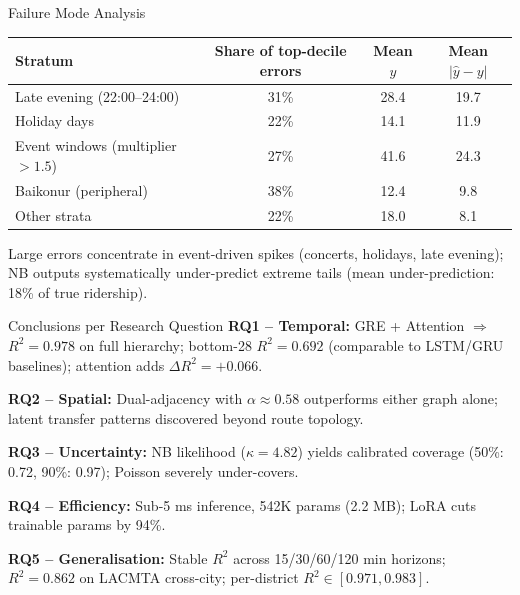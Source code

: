 \documentclass[aspectratio=169, 11pt]{beamer}
\newenvironment{tableslide}[1]{%
  \begin{frame}{#1}%
  \vspace{-0.3em}%
}{%
  \end{frame}%
}
\begin{document}
\begin{tableslide}{Failure Mode Analysis}
\vfill
\begin{center}
\footnotesize
\begin{tabular}{lccc}
  \toprule
  \textbf{Stratum} & \textbf{Share of top-decile errors} & \textbf{Mean $y$} & \textbf{Mean $|\hat y - y|$} \\
  \midrule
  Late evening (22:00--24:00) & 31\% & 28.4 & 19.7 \\
  Holiday days & 22\% & 14.1 & 11.9 \\
  Event windows (multiplier $>1.5$) & 27\% & 41.6 & 24.3 \\
  Baikonur (peripheral) & 38\% & 12.4 & 9.8 \\
  Other strata & 22\% & 18.0 & 8.1 \\
  \bottomrule
\end{tabular}
\end{center}
\vfill
\begin{center}
{\footnotesize Large errors concentrate in event-driven spikes (concerts, holidays, late evening);\\
NB outputs systematically under-predict extreme tails (mean under-prediction: 18\% of true ridership).}
\end{center}
\vspace{0.3em}
\end{tableslide}

\begin{frame}{Conclusions per Research Question}
\footnotesize
\vspace{0.2em}
\textbf{RQ1 -- Temporal:} GRE + Attention $\Rightarrow$ $R^2 = 0.978$ on full hierarchy; bottom-28 $R^2 = 0.692$ (comparable to LSTM/GRU baselines); attention adds $\Delta R^2 = +0.066$.

\vspace{0.4em}
\textbf{RQ2 -- Spatial:} Dual-adjacency with $\alpha \approx 0.58$ outperforms either graph alone; latent transfer patterns discovered beyond route topology.

\vspace{0.4em}
\textbf{RQ3 -- Uncertainty:} NB likelihood ($\kappa=4.82$) yields calibrated coverage (50\%: 0.72, 90\%: 0.97); Poisson severely under-covers.

\vspace{0.4em}
\textbf{RQ4 -- Efficiency:} Sub-5 ms inference, 542K params (2.2 MB); LoRA cuts trainable params by 94\%.

\vspace{0.4em}
\textbf{RQ5 -- Generalisation:} Stable $R^2$ across 15/30/60/120 min horizons; $R^2 = 0.862$ on LACMTA cross-city; per-district $R^2 \in [0.971, 0.983]$.
\end{frame}
\end{document}
